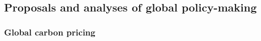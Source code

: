 
\subsection{Proposals and analyses of global policy-making}\label{subsec:literature_policies}

\subsubsection{Global carbon pricing}\label{subsubsec:literature_pricing}

